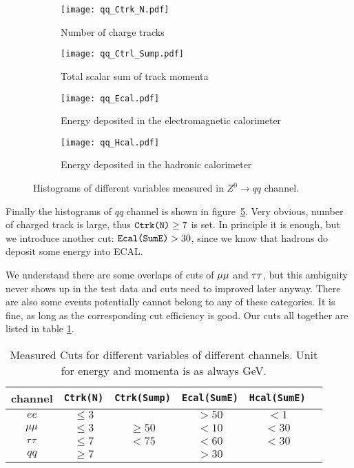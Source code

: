 \begin{figure}[H]  
	\begin{subfigure}[t]{0.5\textwidth}
	\begin{center}
		\texttt{[image: qq\_Ctrk\_N.pdf]}
	\end{center}
	\caption{Number of charge tracks}
	\label{fig:}
	\end{subfigure}%
	\begin{subfigure}[t]{0.5\textwidth}
	\begin{center}
		\texttt{[image: qq\_Ctrl\_Sump.pdf]}
	\end{center}
	\caption{Total scalar sum of track momenta}
	\label{fig:}
	\end{subfigure}
	
	\begin{subfigure}[t]{0.5\textwidth}
	\begin{center}
		\texttt{[image: qq\_Ecal.pdf]}
	\end{center}
	\caption{Energy deposited in the electromagnetic calorimeter}
	\label{fig:}
	\end{subfigure}%
	\begin{subfigure}[t]{0.5\textwidth}
	\begin{center}
		\texttt{[image: qq\_Hcal.pdf]}
	\end{center}
	\caption{Energy deposited in the hadronic calorimeter}
	\label{fig:}
	\end{subfigure}
	\caption{Histograms of different variables measured in $  {Z}^0\rightarrow qq $ channel. }
	\label{Fig:histograms_qq}
\end{figure}
Finally the histograms of $qq$ channel is shown in figure~\ref{Fig:histograms_qq}. Very obvious, number of charged track is large, thus $\verb|Ctrk(N)| \geq 7$ is set. In principle it is enough, but we introduce another cut: $\verb|Ecal(SumE)| > 30$, since we know that hadrons do deposit some energy into ECAL.

We understand there are some overlaps of cuts of $\mu\mu$ and $\tau\tau$, but this ambiguity never shows up in the test data and cuts need to improved later anyway. There are also some events potentially cannot belong to any of these categories. It is fine, as long as the corresponding cut efficiency is good. Our cuts all together are listed in table \ref{Tab:cuts}.
\begin{table}[H]
	\centering
	\begin{tabular}{ccc ccc}
		\toprule
		channel & \verb|Ctrk(N)| & \verb|Ctrk(Sump)| & \verb|Ecal(SumE)| & \verb|Hcal(SumE)| \\
		\midrule
		$ee$ & $ \le 3$  &   &    $ > 50$  & $<1$	\\
		$\mu\mu$ &  $ \le 3$  &  $ \ge 50$  &    $< 10$  & $< 30$	\\
		$\tau\tau$ &  $ \le 7$  & $< 75$  & $ < 60$    & $< 30$	\\
		$qq$ &  $ \ge 7$ &   &  $> 30$    &	\\
		\bottomrule
	\end{tabular}
	\caption{Measured Cuts for different variables of different channels. Unit for energy and momenta is as always \si{\giga\eV}.}
	\label{Tab:cuts}
\end{table}
